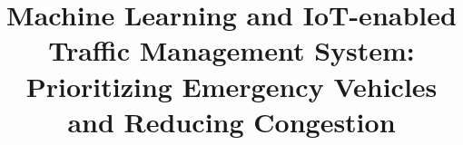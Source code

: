 \documentclass[conference]{IEEEtran}
\begin{document}

\title{\fontsize{18pt}{24pt}\selectfont \textbf{
Machine Learning and IoT-enabled Traffic Management System:\\
Prioritizing Emergency Vehicles and Reducing Congestion\\
}}


\end{document}
